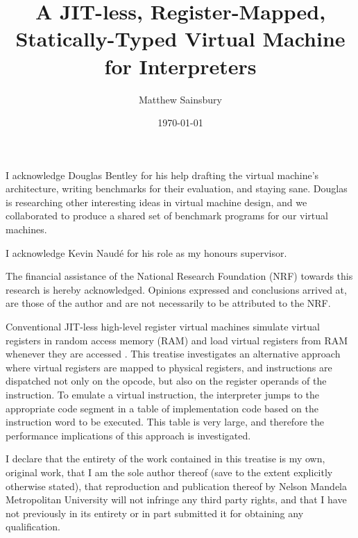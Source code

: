 



\title{A JIT-less, Register-Mapped, Statically-Typed Virtual Machine for Interpreters}
\author{Matthew Sainsbury}
\date{\today}

\begin{titlepage}

		\maketitle
	
\end{titlepage}


	I acknowledge Douglas Bentley for his help drafting the virtual machine's architecture, writing benchmarks for their evaluation, and staying sane. Douglas is researching other interesting ideas in virtual machine design, and we collaborated to produce a shared set of benchmark programs for our virtual machines.
	
	I acknowledge Kevin Naudé for his role as my honours supervisor.
	
	The financial assistance of the National Research Foundation (NRF) towards this research is hereby acknowledged. Opinions expressed and conclusions arrived at, are those of the author and are not necessarily to be attributed to the NRF.

	Conventional JIT-less high-level register virtual machines simulate virtual registers in random access memory (RAM) and load virtual registers from RAM whenever they are accessed \citep{caseregistervm}. This treatise investigates an alternative approach where virtual registers are mapped to physical registers, and instructions are dispatched not only on the opcode, but also on the register operands of the instruction. To emulate a virtual instruction, the interpreter jumps to the appropriate code segment in a table of implementation code based on the instruction word to be executed. This table is very large, and therefore the performance implications of this approach is investigated.

	I declare that the entirety of the work contained in this treatise is my own, original work, that I am the sole author thereof (save to the extent explicitly otherwise stated), that reproduction	and publication thereof by Nelson Mandela Metropolitan University will not infringe any third	party rights, and that I have not previously in its entirety or in part submitted it for obtaining any qualification.
	
